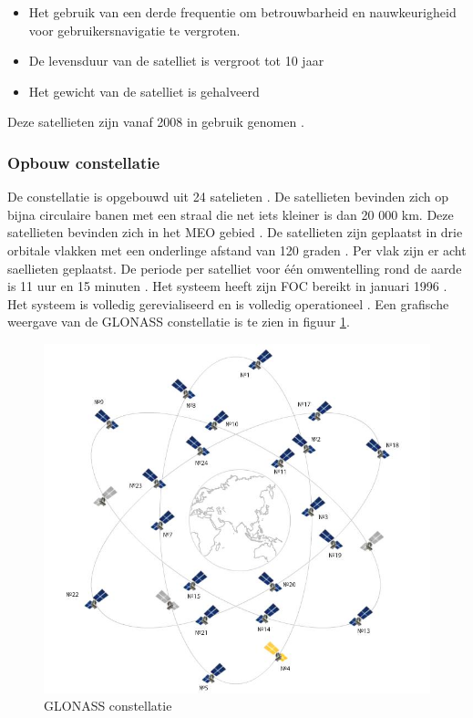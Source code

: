 \begin{itemize}
	\item Het gebruik van een derde frequentie om betrouwbarheid en nauwkeurigheid voor gebruikersnavigatie te vergroten.
	\item De levensduur van de satelliet is vergroot tot 10 jaar
	\item Het gewicht van de satelliet is gehalveerd
\end{itemize}
Deze satellieten zijn vanaf 2008 in gebruik genomen \cite{LBibPPP}.

\subsubsection{Opbouw constellatie} 
De constellatie is opgebouwd uit 24 satelieten \cite{LBibGNSS4}. De satellieten bevinden zich op bijna circulaire banen met een straal die net iets kleiner is dan 20 000 km. Deze satellieten bevinden zich in het MEO gebied \cite{LBibMEO}. De satellieten zijn geplaatst in drie orbitale vlakken met een onderlinge afstand van 120 graden \cite{LBibGLONASS2,LBibGNSS6, LBibGNSS8}. Per vlak zijn er acht saellieten geplaatst. De periode per satelliet voor \'e\'en omwentelling rond de aarde is 11 uur en 15 minuten \cite{LBibGNSS6}.  Het systeem heeft zijn FOC bereikt in januari 1996 \cite{LBibGLONASS}. Het systeem is volledig gerevialiseerd en is volledig operationeel \cite{LBibGNSS4}. Een grafische weergave van de GLONASS constellatie is te zien in figuur \ref{imgGLONASS}.

\begin{figure}[hpb]
	\includegraphics[scale=0.5]{GLONASS.jpg}
	\caption{GLONASS constellatie \cite{LImgGLONASS}}
	\label{imgGLONASS}
\end{figure}

